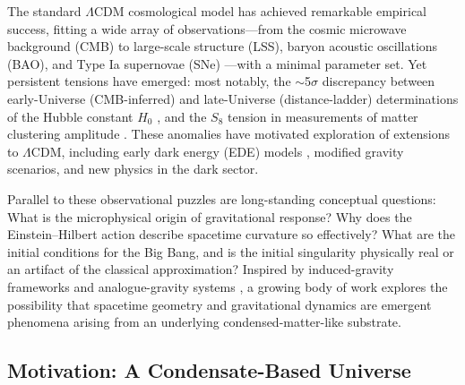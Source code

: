 \documentclass[11pt,a4paper]{article}
\theoremstyle{definition}
\begin{document}
The standard $\Lambda$CDM cosmological model has achieved remarkable empirical success, fitting a wide array of observations---from the cosmic microwave background (CMB) \cite{Planck2018} to large-scale structure (LSS), baryon acoustic oscillations (BAO), and Type Ia supernovae (SNe) \cite{RiessReview2024}---with a minimal parameter set. Yet persistent tensions have emerged: most notably, the $\sim$5$\sigma$ discrepancy between early-Universe (CMB-inferred) and late-Universe (distance-ladder) determinations of the Hubble constant $H_0$ \cite{RiessReview2024,EDEReview2023}, and the $S_8$ tension in measurements of matter clustering amplitude \cite{PlanckS8,DES2021}. These anomalies have motivated exploration of extensions to $\Lambda$CDM, including early dark energy (EDE) models \cite{Poulin2019,PoulinReview2023,EDEReview2023}, modified gravity scenarios, and new physics in the dark sector.

Parallel to these observational puzzles are long-standing conceptual questions: What is the microphysical origin of gravitational response? Why does the Einstein--Hilbert action describe spacetime curvature so effectively? What are the initial conditions for the Big Bang, and is the initial singularity physically real or an artifact of the classical approximation? Inspired by induced-gravity frameworks \cite{Sakharov,Vassilevich} and analogue-gravity systems \cite{Unruh1981,Visser1998,AnalogueGravityReview}, a growing body of work explores the possibility that spacetime geometry and gravitational dynamics are emergent phenomena arising from an underlying condensed-matter-like substrate.

\subsection{Motivation: A Condensate-Based Universe}
\label{sec:motivation}
\end{document}
